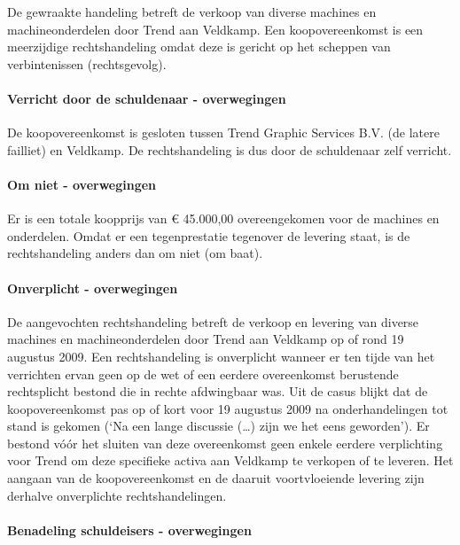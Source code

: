 \documentclass[
  dutch,
  a4paper,
]{article}
\begin{document}
De gewraakte handeling betreft de verkoop van diverse machines en machineonderdelen door Trend aan Veldkamp. Een koopovereenkomst is een meerzijdige rechtshandeling omdat deze is gericht op het scheppen van verbintenissen (rechtsgevolg).

\paragraph{Verricht door de schuldenaar - overwegingen}\label{verricht-door-de-schuldenaar---overwegingen-68}

De koopovereenkomst is gesloten tussen Trend Graphic Services B.V. (de latere failliet) en Veldkamp. De rechtshandeling is dus door de schuldenaar zelf verricht.

\paragraph{Om niet - overwegingen}\label{om-niet---overwegingen-68}

Er is een totale koopprijs van € 45.000,00 overeengekomen voor de machines en onderdelen. Omdat er een tegenprestatie tegenover de levering staat, is de rechtshandeling anders dan om niet (om baat).

\paragraph{Onverplicht - overwegingen}\label{onverplicht---overwegingen-68}

De aangevochten rechtshandeling betreft de verkoop en levering van diverse machines en machineonderdelen door Trend aan Veldkamp op of rond 19 augustus 2009. Een rechtshandeling is onverplicht wanneer er ten tijde van het verrichten ervan geen op de wet of een eerdere overeenkomst berustende rechtsplicht bestond die in rechte afdwingbaar was. Uit de casus blijkt dat de koopovereenkomst pas op of kort voor 19 augustus 2009 na onderhandelingen tot stand is gekomen (`Na een lange discussie (\ldots) zijn we het eens geworden'). Er bestond vóór het sluiten van deze overeenkomst geen enkele eerdere verplichting voor Trend om deze specifieke activa aan Veldkamp te verkopen of te leveren. Het aangaan van de koopovereenkomst en de daaruit voortvloeiende levering zijn derhalve onverplichte rechtshandelingen.

\paragraph{Benadeling schuldeisers - overwegingen}\label{benadeling-schuldeisers---overwegingen-68}
\end{document}
